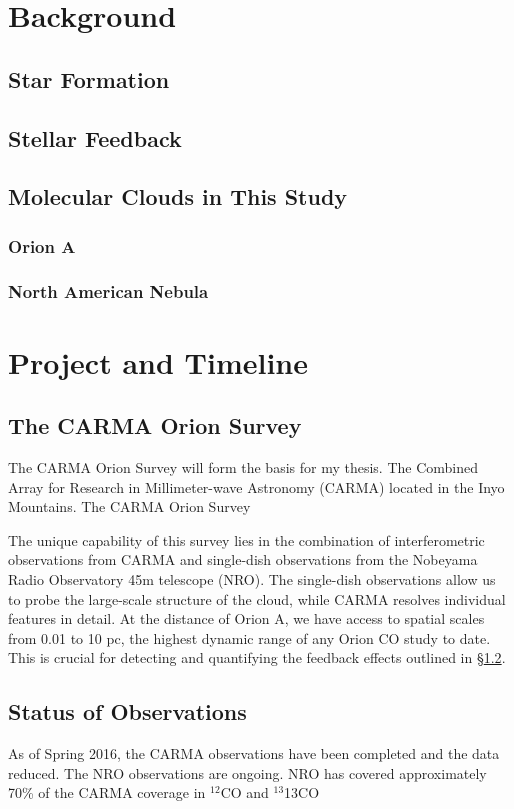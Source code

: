 \section{Background}\label{sec:bkgrd}
\subsection{Star Formation}\label{sec:sf}
\subsection{Stellar Feedback}\label{sec:feedback}
\subsection{Molecular Clouds in This Study}\label{sec:mc}
\subsubsection{Orion A}\label{sec:orion}
\subsubsection{North American Nebula}\label{sec:nan}

\section{Project and Timeline}\label{sec:project}
    \subsection{The CARMA Orion Survey}\label{sec:carma}
    The CARMA Orion Survey will form the basis for my thesis. The Combined Array for Research in Millimeter-wave Astronomy (CARMA) located in the Inyo Mountains. The CARMA Orion Survey %
    
    The unique capability of this survey lies in the combination of interferometric observations from CARMA and single-dish observations from the Nobeyama Radio Observatory 45m telescope (NRO). The single-dish observations allow us to probe the large-scale structure of the cloud, while CARMA resolves individual features in detail. At the distance of Orion A, we have access to spatial scales from 0.01 to 10 pc, the highest dynamic range of any Orion CO study to date. This is crucial for detecting and quantifying the feedback effects outlined in \S\ref{sec:feedback}.
    \subsection{Status of Observations}
    As of Spring 2016, the CARMA observations have been completed and the data reduced. The NRO observations are ongoing. NRO has covered approximately 70\% of the CARMA coverage in $^{12}$CO and $^{13}$13CO
